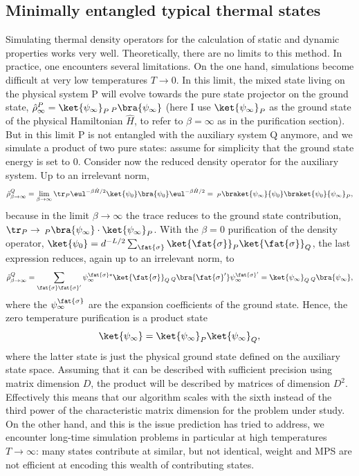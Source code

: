 \subsection{Minimally entangled typical thermal states}
Simulating thermal density operators for the calculation of static and dynamic properties works very well. Theoretically, there are no limits to this method. In practice, one encounters several limitations. On the one hand, simulations become difficult at very low temperatures $T\rightarrow 0$. In this limit, the mixed state living on the physical system P will evolve towards the pure state projector on the ground state, $\hat{\rho}^P_\infty = \ket{\psi_\infty}_P \phantom{\,}_P\bra{\psi_\infty}$ (here I use $\ket{\psi_\infty}_P$ as the ground state of the physical Hamiltonian $\hat{H}$, to refer to $\beta=\infty$ as in the purification section). But in this limit P is not entangled with the auxiliary system Q anymore, and we simulate a product of two pure states: assume for simplicity that the ground state energy is set to 0. Consider now the reduced density operator for the auxiliary system. Up to an irrelevant norm, 
\begin{equation}
\hat{\rho}^Q_{\beta\rightarrow\infty} = \lim_{\beta\rightarrow\infty} \tr_P \eul^{-\beta\hat{H}/2} \ket{\psi_0} \bra{\psi_0} \eul^{-\beta\hat{H}/2} = \phantom{\,}_P\braket{\psi_\infty}{\psi_0} \braket{\psi_0}{\psi_\infty}_P ,
\end{equation}
because in the limit $\beta\rightarrow\infty$ the trace reduces to the ground state contribution,
$\tr_P \rightarrow \phantom{\,}_P\bra{\psi_\infty} \cdot \ket{\psi_\infty}_P$. With the $\beta=0$ purification of the density operator, $\ket{\psi_0} = d^{-L/2} \sum_{\fat{\sigma}} \ket{\fat{\sigma}}_P \ket{\fat{\sigma}}_Q$, the last expression reduces, again up to an irrelevant norm, to
\begin{equation}
\hat{\rho}^Q_{\beta\rightarrow\infty} = \sum_{\fat{\sigma}\fat{\sigma}'} \psi^{\fat{\sigma}*}_\infty \ket{\fat{\sigma}}_Q \phantom{\,}_Q \bra{\fat{\sigma}'} \psi^{\fat{\sigma}'}_\infty =
\ket{\psi_\infty}_Q \phantom{\,}_Q \bra{\psi_\infty} ,
\end{equation}
where the $\psi^{\fat{\sigma}}_\infty$ are the expansion coefficients of the ground state. Hence, the zero temperature purification is a product state 
\begin{equation}
\ket{\psi_\infty} = \ket{\psi_\infty}_P \ket{\psi_\infty}_Q,
\end{equation}
where the latter state is just the physical ground state defined on the auxiliary state space.
Assuming that it can be described with sufficient precision using matrix dimension $D$, the product will be described by matrices of dimension $D^2$. Effectively this means that our algorithm scales with the sixth instead of the third power of the characteristic matrix dimension for the problem under study. On the other hand, and this is the issue prediction has tried to address, we encounter long-time simulation problems in particular at high temperatures $T\rightarrow\infty$: many states contribute at similar, but not identical, weight and MPS are not efficient at encoding this wealth of contributing states.

